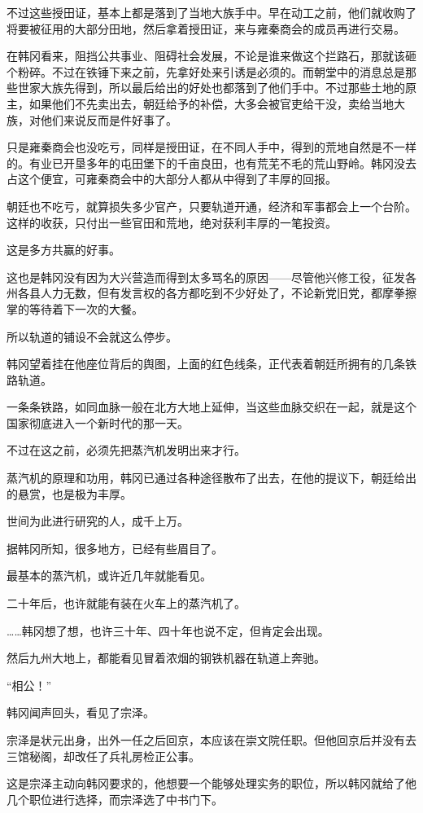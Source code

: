 不过这些授田证，基本上都是落到了当地大族手中。早在动工之前，他们就收购了将要被征用的大部分田地，然后拿着授田证，来与雍秦商会的成员再进行交易。

在韩冈看来，阻挡公共事业、阻碍社会发展，不论是谁来做这个拦路石，那就该砸个粉碎。不过在铁锤下来之前，先拿好处来引诱是必须的。而朝堂中的消息总是那些世家大族先得到，所以最后给出的好处也都落到了他们手中。不过那些土地的原主，如果他们不先卖出去，朝廷给予的补偿，大多会被官吏给干没，卖给当地大族，对他们来说反而是件好事了。

只是雍秦商会也没吃亏，同样是授田证，在不同人手中，得到的荒地自然是不一样的。有业已开垦多年的屯田堡下的千亩良田，也有荒芜不毛的荒山野岭。韩冈没去占这个便宜，可雍秦商会中的大部分人都从中得到了丰厚的回报。

朝廷也不吃亏，就算损失多少官产，只要轨道开通，经济和军事都会上一个台阶。这样的收获，只付出一些官田和荒地，绝对获利丰厚的一笔投资。

这是多方共赢的好事。

这也是韩冈没有因为大兴营造而得到太多骂名的原因——尽管他兴修工役，征发各州各县人力无数，但有发言权的各方都吃到不少好处了，不论新党旧党，都摩拳擦掌的等待着下一次的大餐。

所以轨道的铺设不会就这么停步。

韩冈望着挂在他座位背后的舆图，上面的红色线条，正代表着朝廷所拥有的几条铁路轨道。

一条条铁路，如同血脉一般在北方大地上延伸，当这些血脉交织在一起，就是这个国家彻底进入一个新时代的那一天。

不过在这之前，必须先把蒸汽机发明出来才行。

蒸汽机的原理和功用，韩冈已通过各种途径散布了出去，在他的提议下，朝廷给出的悬赏，也是极为丰厚。

世间为此进行研究的人，成千上万。

据韩冈所知，很多地方，已经有些眉目了。

最基本的蒸汽机，或许近几年就能看见。

二十年后，也许就能有装在火车上的蒸汽机了。

……韩冈想了想，也许三十年、四十年也说不定，但肯定会出现。

然后九州大地上，都能看见冒着浓烟的钢铁机器在轨道上奔驰。

“相公！”

韩冈闻声回头，看见了宗泽。

宗泽是状元出身，出外一任之后回京，本应该在崇文院任职。但他回京后并没有去三馆秘阁，却改任了兵礼房检正公事。

这是宗泽主动向韩冈要求的，他想要一个能够处理实务的职位，所以韩冈就给了他几个职位进行选择，而宗泽选了中书门下。

